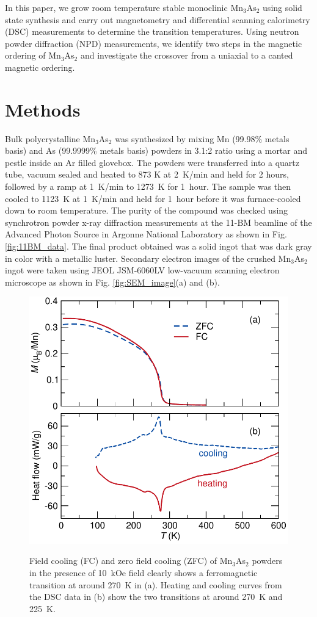 \documentclass[10pt,doublespacing,edeposit]{uiucthesis2020}
\begin{document}
\begin{mainmatter}
In this paper, we grow room temperature stable monoclinic Mn$_3$As$_2$ using solid state synthesis and carry out magnetometry and differential scanning calorimetry (DSC) measurements to determine the transition temperatures. Using neutron powder diffraction (NPD) measurements, we identify two steps in the magnetic ordering of Mn$_3$As$_2$ and  investigate the crossover from a uniaxial to a canted magnetic  ordering.





\section{Methods}


Bulk polycrystalline Mn$_3$As$_2$ was synthesized by mixing Mn (99.98\% metals basis) and As (99.9999\% metals basis) powders in 3.1:2 ratio using a mortar and pestle inside an Ar filled glovebox. The powders were transferred into a quartz tube, vacuum sealed and heated to 873 K at 2~K/min and held for 2 hours, followed by a ramp at 1~K/min to 1273~K for 1~hour. The sample was then cooled to 1123~K at 1~K/min and held for 1~hour before it was furnace-cooled down to room temperature. The purity of the compound was checked using synchrotron powder x-ray diffraction measurements at the 11-BM beamline of the Advanced Photon Source in Argonne National Laboratory as shown in Fig. \ref{fig:11BM_data}. The final product obtained was a solid ingot that was dark gray in color with a metallic luster. Secondary electron images of the crushed Mn$_3$As$_2$ ingot were taken using JEOL JSM-6060LV low-vacuum scanning electron microscope as shown in Fig. \ref{fig:SEM_image}(a) and (b).

\begin{figure}
\centering\includegraphics[width=0.75\columnwidth]{figures/ch6/FC_ZFC_DSC_Mn3As2_cropped.pdf} \\
\caption{Field cooling (FC) and zero field cooling (ZFC) of Mn$_3$As$_2$ powders in the presence of 10~kOe field clearly shows a ferromagnetic transition at around 270~K in (a). Heating and cooling curves from the DSC data in (b) show the two transitions at around 270~K and 225~K.
}
\label{fig:DSC_SQUID_measurement}
\end{figure}


\end{mainmatter}
\end{document}
